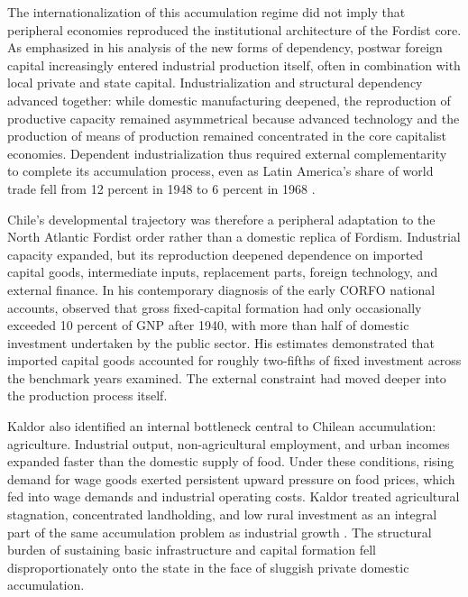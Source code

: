 The internationalization of this accumulation regime did not imply that peripheral economies reproduced the institutional architecture of the Fordist core. As \citet{Cardoso1972} emphasized in his analysis of the new forms of dependency, postwar foreign capital increasingly entered industrial production itself, often in combination with local private and state capital. Industrialization and structural dependency advanced together: while domestic manufacturing deepened, the reproduction of productive capacity remained asymmetrical because advanced technology and the production of means of production remained concentrated in the core capitalist economies. Dependent industrialization thus required external complementarity to complete its accumulation process, even as Latin America's share of world trade fell from 12 percent in 1948 to 6 percent in 1968 \citep{Cardoso1972}.

Chile's developmental trajectory was therefore a peripheral adaptation to the North Atlantic Fordist order rather than a domestic replica of Fordism. Industrial capacity expanded, but its reproduction deepened dependence on imported capital goods, intermediate inputs, replacement parts, foreign technology, and external finance. In his contemporary diagnosis of the early CORFO national accounts, \citet{Kaldor1959} observed that gross fixed-capital formation had only occasionally exceeded 10 percent of GNP after 1940, with more than half of domestic investment undertaken by the public sector. His estimates demonstrated that imported capital goods accounted for roughly two-fifths of fixed investment across the benchmark years examined. The external constraint had moved deeper into the production process itself.

Kaldor also identified an internal bottleneck central to Chilean accumulation: agriculture. Industrial output, non-agricultural employment, and urban incomes expanded faster than the domestic supply of food. Under these conditions, rising demand for wage goods exerted persistent upward pressure on food prices, which fed into wage demands and industrial operating costs. Kaldor treated agricultural stagnation, concentrated landholding, and low rural investment as an integral part of the same accumulation problem as industrial growth \citep{Kaldor1959}. The structural burden of sustaining basic infrastructure and capital formation fell disproportionately onto the state in the face of sluggish private domestic accumulation.

